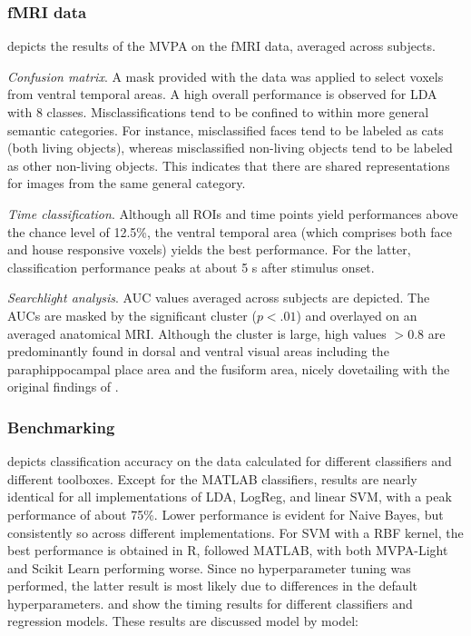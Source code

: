 \documentclass[utf8]{frontiersSCNS} %
\begin{document}
\subsubsection{fMRI data}

 depicts the results of the MVPA on the fMRI data, averaged across subjects.

\textit{Confusion matrix}. A mask provided with the data was applied to select voxels from ventral temporal areas.
A high overall performance is observed for LDA with 8 classes. Misclassifications tend to be confined to within more general semantic categories. For instance, misclassified faces tend to be labeled as cats (both living objects), whereas misclassified non-living objects tend to be labeled as other non-living objects. This indicates that there are shared representations for images from the same general category.

\textit{Time classification}. Although all ROIs and time points yield performances above the chance level of 12.5\%, the ventral temporal area (which comprises both face and house responsive voxels) yields the best performance. For the latter, classification performance peaks at about 5 s after stimulus onset.

\textit{Searchlight analysis}. AUC values averaged across subjects are depicted. The AUCs are masked by the significant cluster ($p < .01$) and overlayed on an averaged anatomical MRI. Although the cluster is large, high values $>0.8$ are predominantly found in dorsal and ventral visual areas including the paraphippocampal place area and the fusiform area, nicely dovetailing with the original findings of \cite{Haxby2001}.

\subsubsection{Benchmarking}

 depicts classification accuracy on the \cite{Wakeman2015ADataset} data calculated for different classifiers and different toolboxes. Except for the MATLAB classifiers, results are nearly identical  for all implementations of LDA, LogReg, and linear SVM, with a peak performance of about 75\%. Lower performance is evident for Naive Bayes, but consistently so across different implementations. For SVM with a RBF kernel, the best performance is obtained in R, followed MATLAB, with both MVPA-Light and Scikit Learn performing worse. Since no hyperparameter tuning was performed, the latter result is most likely due to differences in the default hyperparameters.  and  show the timing results for different classifiers and regression models. These results are discussed model by model:
\end{document}
